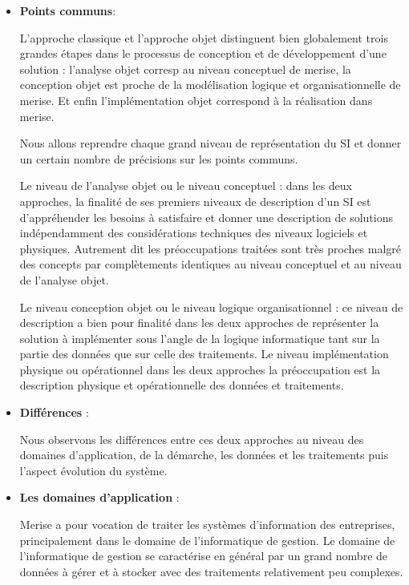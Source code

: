 \vspace{1em}
\begin{itemize}
	\setlength\itemsep{1em}
	\item \textbf{Points communs}:

	L’approche classique et l’approche objet distinguent bien globalement trois grandes étapes dans le processus de conception et de développement d’une solution : l’analyse objet corresp au niveau conceptuel de merise, la conception objet est proche de la modélisation logique et organisationnelle de merise. Et enfin l’implémentation objet correspond à la réalisation dans merise.

	      Nous allons reprendre chaque grand niveau de représentation du SI et donner un certain nombre
	      de précisions sur les points communs.

	      Le niveau de l’analyse objet ou le niveau conceptuel : dans les deux approches, la finalité de ses premiers niveaux de description d’un SI est d’appréhender les besoins à satisfaire et donner une description de solutions indépendamment des considérations techniques des niveaux logiciels et physiques. Autrement dit les préoccupations traitées sont très proches malgré des concepts par complètements identiques au niveau conceptuel et au niveau de l’analyse objet.

	      Le niveau conception objet ou le niveau logique organisationnel : ce niveau de description a bien pour finalité dans les deux approches de représenter la solution à implémenter sous l’angle de la logique informatique tant sur la partie des données que sur celle des traitements. Le niveau implémentation physique ou opérationnel dans les deux approches la préoccupation est la description physique et opérationnelle des données et traitements.

	\item \textbf{Différences} :

	      Nous observons les différences entre ces deux approches au niveau des domaines d’application,
	      de la démarche, les données et les traitements puis l’aspect évolution du système.

	\item \textbf{Les domaines d’application} :

	Merise a pour vocation de traiter les systèmes d’information des entreprises, principalement dans le domaine de l’informatique de gestion. Le domaine de l’informatique de gestion se caractérise en général par un grand nombre de données à gérer et à stocker avec des traitements relativement peu complexes.


\end{itemize}
